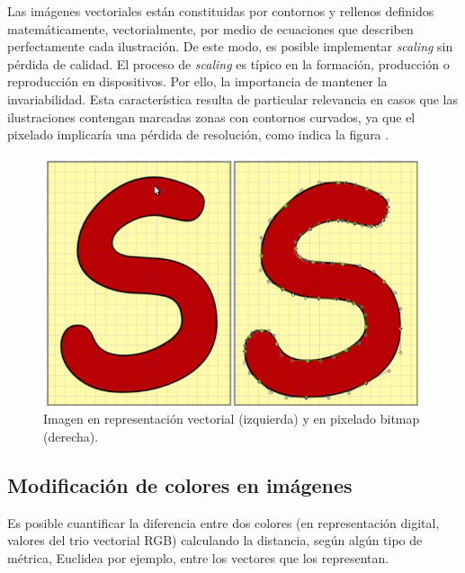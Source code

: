 Las im\'agenes vectoriales est\'an constituidas por contornos y rellenos definidos matem\'aticamente, vectorialmente,  por medio de ecuaciones que
describen perfectamente cada ilustraci\'on.
%
De este modo, es posible implementar \textit{scaling} sin p\'erdida de calidad.
%
El proceso de \textit{scaling} es t\'ipico en la formaci\'on, producci\'on o reproducci\'on en dispositivos. Por ello, la importancia de mantener la
invariabilidad.
%
Esta caracter\'istica resulta de particular relevancia en casos que las ilustraciones contengan marcadas zonas con contornos curvados, ya que el pixelado
implicar\'ia una p\'erdida de resoluci\'on, como indica la figura .

%

\begin{center}
\begin{figure} [!h]

\centering
\includegraphics[width=12cm]{figures/Fig2_1.png}

\caption{Imagen en representaci\'on vectorial (izquierda) y en pixelado bitmap (derecha).}
\label{Fig2_1}

\end{figure}
\end{center}



\subsection{Modificaci\'on de colores en im\'agenes}


Es posible cuantificar la diferencia entre dos colores (en representaci\'on digital, valores del trio vectorial RGB) calculando la distancia, seg\'un alg\'un
tipo de m\'etrica, Euclidea por ejemplo, entre los vectores que los representan.
%

